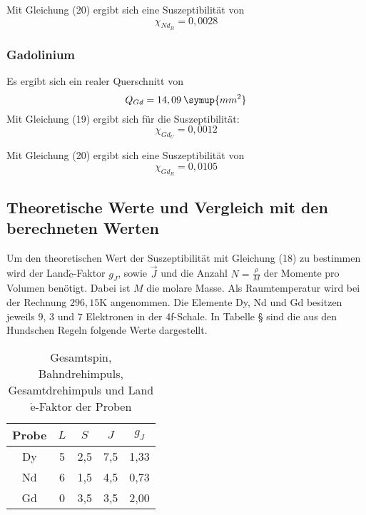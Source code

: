 Mit Gleichung (20) ergibt sich eine Suszeptibilität von
\begin{equation*}
  \chi_{Nd_R} = 0,0028 %
\end{equation*}

\subsubsection{Gadolinium}
Es ergibt sich ein realer Querschnitt von
\begin{equation*}
  Q_{Gd} = 14,09 \: \symup{mm^2}  %
\end{equation*}
Mit Gleichung (19) ergibt sich für die Suszeptibilität:
\begin{equation*}
  \chi_{Gd_U} = 0,0012 %
\end{equation*}

Mit Gleichung (20) ergibt sich eine Suszeptibilität von
\begin{equation*}
  \chi_{Gd_R} = 0,0105 %
\end{equation*}


\subsection{Theoretische Werte und Vergleich mit den berechneten Werten}

Um den theoretischen Wert der Suszeptibilität mit Gleichung (18) zu bestimmen wird der Land$\acute{\text{e}}$-Faktor $g_J$, sowie $\vec{J}$ und
die Anzahl $N= \frac{\rho}{M}$ der Momente pro Volumen benötigt. Dabei ist $M$ die molare Masse. Als Raumtemperatur wird bei der
Rechnung $296,15$K angenommen. Die Elemente Dy, Nd und Gd besitzen jeweils $9$, $3$ und $7$ Elektronen in der 4f-Schale. In Tabelle §
sind die aus den Hundschen Regeln folgende Werte dargestellt.

\begin{table}[H]
  \centering
  \caption{Gesamtspin, Bahndrehimpuls, Gesamtdrehimpuls und Land$\acute{\text{e}}$-Faktor der Proben}
  \label{tab:Dy}
  \begin{tabular}{c c c c c}
    \toprule
    Probe & $L$ & $S$ & $J$  & $g_J$  \\
    \midrule
    Dy & 5 & 2,5 & 7,5 & 1,33\\
    Nd & 6 & 1,5 & 4,5 & 0,73\\
    Gd & 0 & 3,5 & 3,5 & 2,00\\
    \bottomrule
  \end{tabular}
\end{table}

